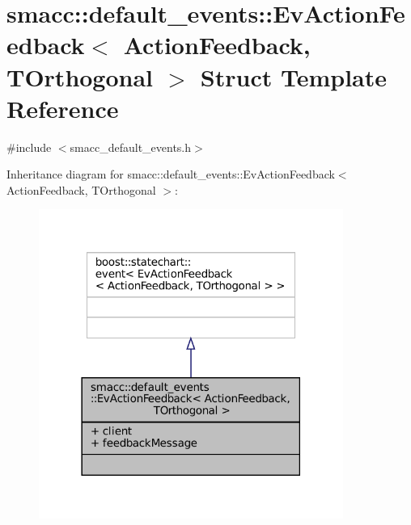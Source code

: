 \hypertarget{structsmacc_1_1default__events_1_1EvActionFeedback}{}\section{smacc\+:\+:default\+\_\+events\+:\+:Ev\+Action\+Feedback$<$ Action\+Feedback, T\+Orthogonal $>$ Struct Template Reference}
\label{structsmacc_1_1default__events_1_1EvActionFeedback}


{\ttfamily \#include $<$smacc\+\_\+default\+\_\+events.\+h$>$}



Inheritance diagram for smacc\+:\+:default\+\_\+events\+:\+:Ev\+Action\+Feedback$<$ Action\+Feedback, T\+Orthogonal $>$\+:
\nopagebreak
\begin{figure}[H]
\begin{center}
\leavevmode
\includegraphics[width=282pt]{structsmacc_1_1default__events_1_1EvActionFeedback__inherit__graph}
\end{center}
\end{figure}


